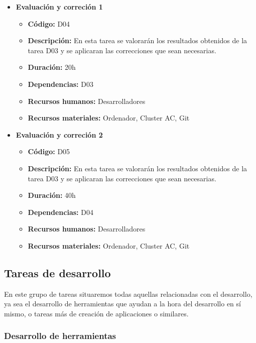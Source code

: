 \begin{itemize}
\begin{itemize}
        \end{itemize}
    \item \textbf{Evaluación y correción 1}
        \begin{itemize}
            \item \textbf{Código:} D04
            \item \textbf{Descripción:} En esta tarea se valorarán los resultados obtenidos de la tarea D03 y se aplicaran las correcciones que sean
                necesarias.
            \item \textbf{Duración:} 20h
            \item \textbf{Dependencias:} D03
            \item \textbf{Recursos humanos:} Desarrolladores
            \item \textbf{Recursos materiales:} Ordenador, Cluster AC, Git
        \end{itemize}
    \item \textbf{Evaluación y correción 2}
        \begin{itemize}
            \item \textbf{Código:} D05
            \item \textbf{Descripción:} En esta tarea se valorarán los resultados obtenidos de la tarea D03 y se aplicaran las correcciones que sean
                necesarias.
            \item \textbf{Duración:} 40h
            \item \textbf{Dependencias:} D04
            \item \textbf{Recursos humanos:} Desarrolladores
            \item \textbf{Recursos materiales:} Ordenador, Cluster AC, Git
        \end{itemize}
\end{itemize}

\subsection{Tareas de desarrollo}
\label{subsec:tareas_desarrollo}


En este grupo de tareas situaremos todas aquellas relacionadas con el desarrollo,
ya sea el desarrollo de herramientas que ayudan a la hora del desarrollo en
sí mismo, o tareas más de creación de aplicaciones o similares.

\subsubsection{Desarrollo de herramientas}
\label{subsubsec:tareas_herramientas}

